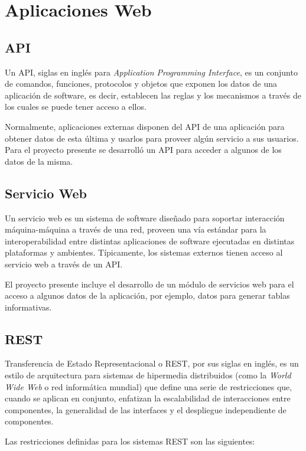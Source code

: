 \section{Aplicaciones Web}
    \subsection{API}
    Un API, siglas en inglés para \textit{Application Programming Interface}, es un conjunto de comandos, funciones, protocolos y objetos que exponen los datos de una aplicación de software, es decir, establecen las reglas y los mecanismos a través de los cuales se puede tener acceso a ellos. \cite{apiChristensson}

    Normalmente, aplicaciones externas disponen del API de una aplicación para obtener datos de esta última y usarlos para proveer algún servicio a sus usuarios. Para el proyecto presente se desarrolló un API para acceder a algunos de los datos de la misma.

    \subsection{Servicio Web} \label{webService}
    Un servicio web es un sistema de software diseñado para soportar interacción máquina-máquina a través de una red, proveen una vía estándar para la interoperabilidad entre distintas aplicaciones de software ejecutadas en distintas plataformas y ambientes. \cite{webServiceW3C} Típicamente, los sistemas externos tienen acceso al servicio web a través de un API.

    El proyecto presente incluye el desarrollo de un módulo de servicios web para el acceso a algunos datos de la aplicación, por ejemplo, datos para generar tablas informativas.

    \subsection{REST}
    Transferencia de Estado Representacional o REST, por sus siglas en inglés, es un estilo de arquitectura para sistemas de hipermedia distribuidos (como la \textit{World Wide Web} o red informática mundial) que define una serie de restricciones que, cuando se aplican en conjunto, enfatizan la escalabilidad de interacciones entre componentes, la generalidad de las interfaces y el despliegue independiente de componentes. \cite{restFielding}

    Las restricciones definidas para los sistemas REST son las siguientes:

